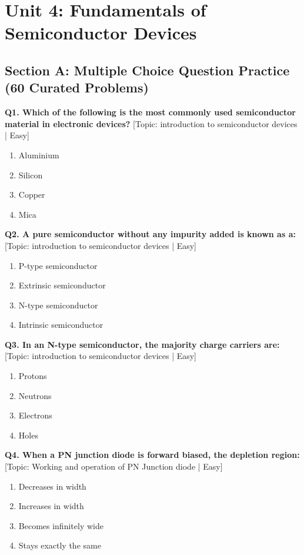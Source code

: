 \chapter{Unit 4: Fundamentals of Semiconductor Devices}

\section{Section A: Multiple Choice Question Practice (60 Curated Problems)}

\noindent\textbf{Q1. Which of the following is the most commonly used semiconductor material in electronic devices?} \hfill [Topic: introduction to semiconductor devices | Easy]
\begin{enumerate}[label=(\alph*),topsep=2pt,itemsep=1pt,partopsep=0pt,parsep=0pt]
    \item {Aluminium}
    \item {Silicon}
    \item {Copper}
    \item {Mica}
\end{enumerate}
\vspace{2mm}

\noindent\textbf{Q2. A pure semiconductor without any impurity added is known as a:} \hfill [Topic: introduction to semiconductor devices | Easy]
\begin{enumerate}[label=(\alph*),topsep=2pt,itemsep=1pt,partopsep=0pt,parsep=0pt]
    \item {P-type semiconductor}
    \item {Extrinsic semiconductor}
    \item {N-type semiconductor}
    \item {Intrinsic semiconductor}
\end{enumerate}
\vspace{2mm}

\noindent\textbf{Q3. In an N-type semiconductor, the majority charge carriers are:} \hfill [Topic: introduction to semiconductor devices | Easy]
\begin{enumerate}[label=(\alph*),topsep=2pt,itemsep=1pt,partopsep=0pt,parsep=0pt]
    \item {Protons}
    \item {Neutrons}
    \item {Electrons}
    \item {Holes}
\end{enumerate}
\vspace{2mm}

\noindent\textbf{Q4. When a PN junction diode is forward biased, the depletion region:} \hfill [Topic: Working and operation of PN Junction diode | Easy]
\begin{enumerate}[label=(\alph*),topsep=2pt,itemsep=1pt,partopsep=0pt,parsep=0pt]
    \item {Decreases in width}
    \item {Increases in width}
    \item {Becomes infinitely wide}
    \item {Stays exactly the same}
\end{enumerate}
\vspace{2mm}

